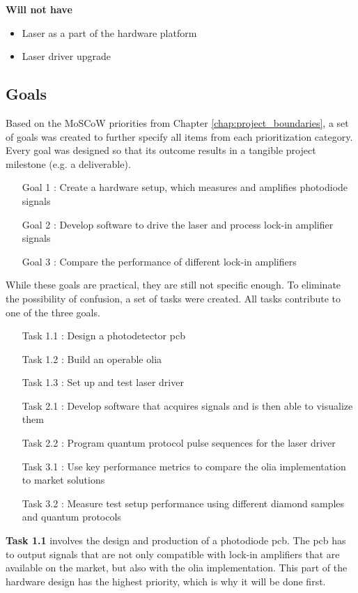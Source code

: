 \textbf{Will not have}
\begin{itemize}
	\item Laser as a part of the hardware platform
	\item Laser driver upgrade
\end{itemize}


\subsection{Goals} \label{chap:goals}
Based on the MoSCoW priorities from Chapter \ref{chap:project_boundaries}, a set of goals was created to further specify all items from each prioritization category. Every goal was designed so that its outcome results in a tangible project milestone (e.g. a deliverable).

\begin{itemize}
	\item[Goal 1]: Create a hardware setup, which measures and amplifies photodiode signals
	\item[Goal 2]: Develop software to drive the laser and process lock-in amplifier signals
	\item[Goal 3]: Compare the performance of different lock-in amplifiers
\end{itemize}

While these goals are practical, they are still not specific enough. To eliminate the possibility of confusion, a set of tasks were created. All tasks contribute to one of the three goals.

\begin{itemize}
	\item[Task 1.1]: Design a photodetector \gls{pcb}
	\item[Task 1.2]: Build an operable \gls{olia}
	\item[Task 1.3]: Set up and test laser driver
	\item[Task 2.1]: Develop software that acquires signals and is then able to visualize them
	\item[Task 2.2]: Program quantum protocol pulse sequences for the laser driver
	\item[Task 3.1]: Use key performance metrics to compare the \gls{olia} implementation to market solutions
	\item[Task 3.2]: Measure test setup performance using different diamond samples and quantum protocols
\end{itemize}

\textbf{Task 1.1} involves the design and production of a photodiode \gls{pcb}. The \gls{pcb} has to output signals that are not only compatible with lock-in amplifiers that are available on the market, but also with the \gls{olia} implementation. This part of the hardware design has the highest priority, which is why it will be done first. 

